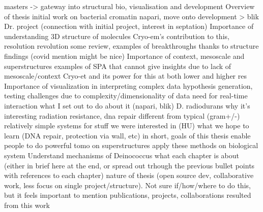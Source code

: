 \begin{outline}
\1 \tick masters -> gateway into structural bio, visualisation and development
\1 Overview of thesis
    \2 initial work on bacterial cromatin
    \2 napari, move onto development > blik
    \2 Dr. project (connection with initial project, interest in septation)
\1 Importance of understanding 3D structure of molecules
    \2 Cryo-em's contribution to this, resolution revolution
    \2 some review, examples of breakthroughs thanks to structure findings (covid mention might be nice)
\1 Importance of context, mesoscale and superstructures
    \2 examples of SPA that cannot give insights due to lack of mesoscale/context
    \2 Cryo-et and its power for this at both lower and higher res
\1 Importance of visualization in interpreting complex data
    \2 hypothesis generation, testing
    \2 challenges due to complexity/dimensionality of data
    \2 need for real-time interaction
    \2 what I set out to do about it (napari, blik)
\1 D. radiodurans
    \2 why it's interesting
        \3 radiation resistance, dna repair
        \3 different from typical (gram+/-)
        \3 relatively simple systems for stuff we were interested in (HU)
    \2 what we hope to learn (DNA repair, protection via wall, etc)
\1 in short, goals of this thesis
    \2 enable people to do powerful tomo on superstructures
    \2 apply these methods on biological system
    \2 Understand mechanisms of Deinococcus
\1 what each chapter is about (either in brief here at the end, or spread out trhough the previous bullet points with references to each chapter)
\1 nature of thesis (open source dev, collaborative work, less focus on single project/structure). Not sure if/how/where to do this, but it feels important to mention
\1 publications, projects, collaborations resulted from this work
\end{outline}
